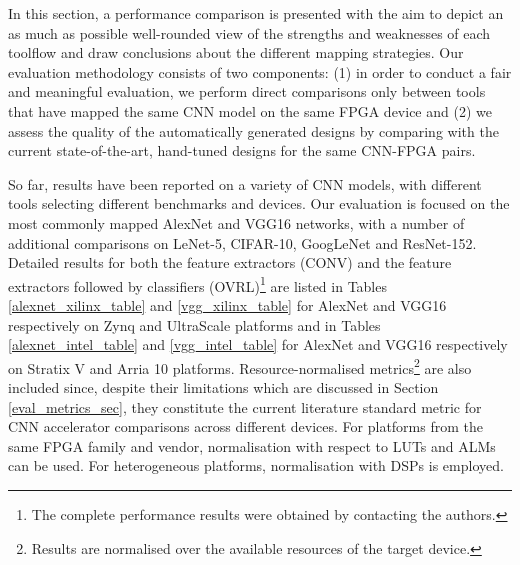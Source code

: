 \documentclass[format=acmsmall, review=false, screen=true]{acmart}
\begin{document}
In this section, a performance comparison is presented with the aim to depict an as much as possible well-rounded view of the strengths and weaknesses of each toolflow and draw conclusions about the different mapping strategies. Our evaluation methodology consists of two components: (1) in order to conduct a fair and meaningful evaluation, we perform direct comparisons only between tools that have mapped the same CNN model on the same FPGA device and (2) we assess the quality of the automatically generated designs by comparing with the current state-of-the-art, hand-tuned designs for the same CNN-FPGA pairs.

So far, results have been reported on a variety of CNN models, with different tools selecting different benchmarks and devices. Our evaluation is focused on the most commonly mapped AlexNet and VGG16 networks, {\color{black}with a number of additional comparisons on LeNet-5, CIFAR-10, GoogLeNet and ResNet-152.} Detailed results for both the feature extractors (CONV) and the feature extractors followed by classifiers (OVRL)\footnote{The complete performance results were obtained by contacting the authors.} are listed in Tables \ref{alexnet_xilinx_table} and \ref{vgg_xilinx_table} for AlexNet and VGG16 respectively on Zynq and UltraScale platforms and in Tables \ref{alexnet_intel_table} and \ref{vgg_intel_table} for AlexNet and VGG16 respectively on Stratix V and Arria 10 platforms. Resource-normalised metrics\footnote{Results are normalised over the available resources of the target device.} are also included since, despite their limitations which are discussed in Section \ref{eval_metrics_sec}, they constitute the current literature standard metric for CNN accelerator comparisons across different devices. For platforms from the same FPGA family and vendor, normalisation with respect to LUTs and ALMs can be used. For heterogeneous platforms, normalisation with DSPs is employed.

\end{document}
